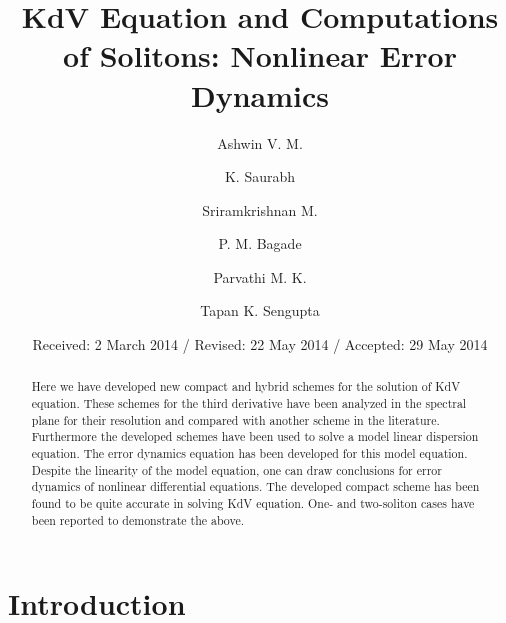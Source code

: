 \documentclass{svjour3}                    %
\begin{document}
\title{KdV Equation and Computations of Solitons: Nonlinear Error Dynamics}


\author{Ashwin V. M.\and K. Saurabh \and Sriramkrishnan M.\and  P. M. Bagade\and Parvathi M. K. \and Tapan K. Sengupta }


\date{Received: 2 March 2014 / Revised: 22 May 2014 / Accepted: 29 May 2014}


\maketitle

\begin{abstract}
Here we have developed new compact and hybrid schemes for the solution of KdV equation. These schemes for the third derivative have been analyzed 
in the spectral plane for their resolution and compared with another scheme in the literature. Furthermore the developed schemes have been used
to solve a model linear dispersion equation. The error dynamics equation has been developed for this model equation. Despite the linearity of the 
model equation, one can draw conclusions for error dynamics of nonlinear differential equations. The developed compact scheme has been found to be 
quite accurate in solving KdV equation. One- and two-soliton cases have been reported to demonstrate the above.

 
\end{abstract}



\section{Introduction}
\end{document}
